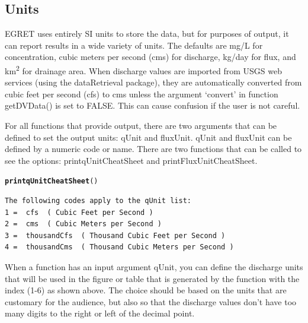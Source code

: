 \documentclass[a4paper,11pt]{article}\usepackage[]{graphicx}\usepackage[]{color}
\makeatletter
\newcommand{\hlstd}[1]{\textcolor[rgb]{0.345,0.345,0.345}{#1}}%
\newcommand{\hlkwd}[1]{\textcolor[rgb]{0.737,0.353,0.396}{\textbf{#1}}}%
\newenvironment{kframe}{%
 \def\at@end@of@kframe{}%
 \ifinner\ifhmode%
  \def\at@end@of@kframe{\end{minipage}}%
  \begin{minipage}{\columnwidth}%
 \fi\fi%
 \def\FrameCommand##1{\hskip\@totalleftmargin \hskip-\fboxsep
 \colorbox{shadecolor}{##1}\hskip-\fboxsep
     \hskip-\linewidth \hskip-\@totalleftmargin \hskip\columnwidth}%
 \MakeFramed {\advance\hsize-\width
   \@totalleftmargin\z@ \linewidth\hsize
   \@setminipage}}%
 {\par\unskip\endMakeFramed%
 \at@end@of@kframe}
\newenvironment{knitrout}{}{} %
\makeatother
\begin{document}
\FloatBarrier
\pagebreak


\subsection{Units}
\label{sec:units}
EGRET uses entirely SI units to store the data, but for purposes of output, it can report results in a wide variety of units. The defaults are mg/L for concentration, cubic meters per second (cms) for discharge, kg/day for flux, and km\textsuperscript{2} for drainage area. When discharge values are imported from USGS web services (using the dataRetrieval package), they are automatically converted from cubic feet per second (cfs) to cms unless the argument `convert' in function getDVData() is set to FALSE.  This can cause confusion if the user is not careful. 

For all functions that provide output, there are two arguments that can be defined to set the output units: qUnit and fluxUnit.  qUnit and fluxUnit can be defined by a numeric code or name.  There are two functions that can be called to see the options: printqUnitCheatSheet and printFluxUnitCheatSheet.


\begin{knitrout}
\color{fgcolor}\begin{kframe}
\begin{alltt}
\hlkwd{printqUnitCheatSheet}\hlstd{()}
\end{alltt}
\begin{verbatim}
The following codes apply to the qUnit list:
1 =  cfs  ( Cubic Feet per Second )
2 =  cms  ( Cubic Meters per Second )
3 =  thousandCfs  ( Thousand Cubic Feet per Second )
4 =  thousandCms  ( Thousand Cubic Meters per Second )
\end{verbatim}
\end{kframe}
\end{knitrout}


When a function has an input argument qUnit, you can define the discharge units that will be used in the figure or table that is generated by the function with the index (1-6) as shown above. The choice should be based on the units that are customary for the audience, but also so that the discharge values don't have too many digits to the right or left of the decimal point.
\end{document}
